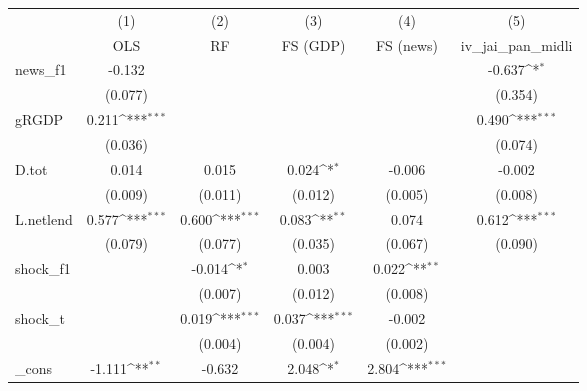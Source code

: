 {
\def\sym#1{\ifmmode^{#1}\else\(^{#1}\)\fi}
\begin{tabular}{l*{5}{c}}
\toprule
            &\multicolumn{1}{c}{(1)}&\multicolumn{1}{c}{(2)}&\multicolumn{1}{c}{(3)}&\multicolumn{1}{c}{(4)}&\multicolumn{1}{c}{(5)}\\
            &\multicolumn{1}{c}{OLS}&\multicolumn{1}{c}{RF}&\multicolumn{1}{c}{FS (GDP)}&\multicolumn{1}{c}{FS (news)}&\multicolumn{1}{c}{iv\_jai\_pan\_midli}\\
\midrule
news\_f1     &      -0.132         &                     &                     &                     &      -0.637\sym{*}  \\
            &     (0.077)         &                     &                     &                     &     (0.354)         \\
\addlinespace
gRGDP       &       0.211\sym{***}&                     &                     &                     &       0.490\sym{***}\\
            &     (0.036)         &                     &                     &                     &     (0.074)         \\
\addlinespace
D.tot       &       0.014         &       0.015         &       0.024\sym{*}  &      -0.006         &      -0.002         \\
            &     (0.009)         &     (0.011)         &     (0.012)         &     (0.005)         &     (0.008)         \\
\addlinespace
L.netlend   &       0.577\sym{***}&       0.600\sym{***}&       0.083\sym{**} &       0.074         &       0.612\sym{***}\\
            &     (0.079)         &     (0.077)         &     (0.035)         &     (0.067)         &     (0.090)         \\
\addlinespace
shock\_f1    &                     &      -0.014\sym{*}  &       0.003         &       0.022\sym{**} &                     \\
            &                     &     (0.007)         &     (0.012)         &     (0.008)         &                     \\
\addlinespace
shock\_t     &                     &       0.019\sym{***}&       0.037\sym{***}&      -0.002         &                     \\
            &                     &     (0.004)         &     (0.004)         &     (0.002)         &                     \\
\addlinespace
\_cons      &      -1.111\sym{**} &      -0.632         &       2.048\sym{*}  &       2.804\sym{***}&                     \\

\end{tabular}}
